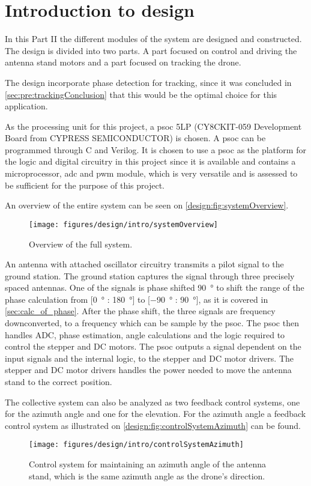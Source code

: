 \chapter{Introduction to design}\label{sec:introToDesign}
In this Part II the different modules of the system are designed and constructed. The design is divided into two parts. A part focused on control and driving the antenna stand motors and a part focused on tracking the drone.

The design incorporate phase detection for tracking, since it was concluded in \autoref{sec:pre:trackingConclusion} that this would be the optimal choice for this application.  

As the processing unit for this project, a \gls{psoc} 5LP (CY8CKIT-059 Development Board from CYPRESS SEMICONDUCTOR) \citep{datasheet:PSoC5LP:_CY8C58LP_Family} is chosen. A \gls{psoc} can be programmed through C and Verilog. It is chosen to use a \gls{psoc} as the platform for the logic and digital circuitry in this project since it is available and contains a microprocessor, \gls{adc} and \gls{pwm} module, which is very versatile and is assessed to be sufficient for the purpose of this project.

An overview of the entire system can be seen on \autoref{design:fig:systemOverview}.
\begin{figure}[!h]
\centering
\texttt{[image: figures/design/intro/systemOverview]}
\caption{Overview of the full system.}\label{design:fig:systemOverview}
\end{figure}

An antenna with attached oscillator circuitry transmits a pilot signal to the ground station.
The ground station captures the signal through three precisely spaced antennas. One of the signals is phase shifted \SI{90}{\degree} to shift the range of the phase calculation from [\SI{0}{\degree} : \SI{180}{\degree}] to [\SI{-90}{\degree} : \SI{90}{\degree}], as it is covered in \autoref{sec:calc_of_phase}. After the phase shift, the three signals are frequency downconverted, to a frequency which can be sample by the \gls{psoc}. The \gls{psoc} then handles ADC, phase estimation, angle calculations and the logic required to control the stepper and DC motors. The \gls{psoc} outputs a signal dependent on the input signals and the internal logic, to the stepper and DC motor drivers. The stepper and DC motor drivers handles the power needed to move the antenna stand to the correct position.

The collective system can also be analyzed as two feedback control systems, one for the azimuth angle and one for the elevation.
For the azimuth angle a feedback control system as illustrated on \autoref{design:fig:controlSystemAzimuth} can be found.
\begin{figure}[!h]
\centering
\texttt{[image: figures/design/intro/controlSystemAzimuth]}
\caption{Control system for maintaining an azimuth angle of the antenna stand, which is the same azimuth angle as the drone's direction.}\label{design:fig:controlSystemAzimuth}
\end{figure}


